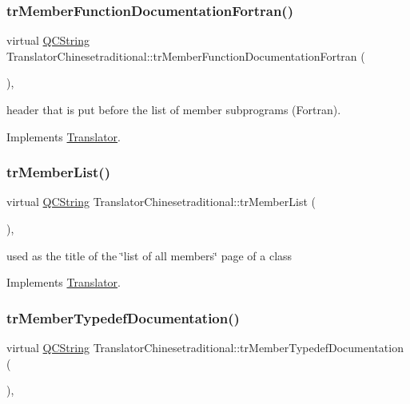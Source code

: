 \subsubsection{\texorpdfstring{trMemberFunctionDocumentationFortran()}{trMemberFunctionDocumentationFortran()}}
{\footnotesize\ttfamily virtual \mbox{\hyperlink{class_q_c_string}{Q\+C\+String}} Translator\+Chinesetraditional\+::tr\+Member\+Function\+Documentation\+Fortran (\begin{DoxyParamCaption}{ }\end{DoxyParamCaption})\hspace{0.3cm}{\ttfamily [inline]}, {\ttfamily [virtual]}}

header that is put before the list of member subprograms (Fortran). 

Implements \mbox{\hyperlink{class_translator}{Translator}}.

\mbox{\label{class_translator_chinesetraditional_a4d1801a929911c35cf61bd97b7fdcbbc}} 
\subsubsection{\texorpdfstring{trMemberList()}{trMemberList()}}
{\footnotesize\ttfamily virtual \mbox{\hyperlink{class_q_c_string}{Q\+C\+String}} Translator\+Chinesetraditional\+::tr\+Member\+List (\begin{DoxyParamCaption}{ }\end{DoxyParamCaption})\hspace{0.3cm}{\ttfamily [inline]}, {\ttfamily [virtual]}}

used as the title of the \char`\"{}list of all members\char`\"{} page of a class 

Implements \mbox{\hyperlink{class_translator}{Translator}}.

\mbox{\label{class_translator_chinesetraditional_a61aa7fe0392853be8c7db7243aa854de}} 
\subsubsection{\texorpdfstring{trMemberTypedefDocumentation()}{trMemberTypedefDocumentation()}}
{\footnotesize\ttfamily virtual \mbox{\hyperlink{class_q_c_string}{Q\+C\+String}} Translator\+Chinesetraditional\+::tr\+Member\+Typedef\+Documentation (\begin{DoxyParamCaption}{ }\end{DoxyParamCaption})\hspace{0.3cm}{\ttfamily [inline]}, {\ttfamily [virtual]}}

